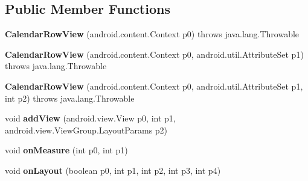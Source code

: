 \subsection*{Public Member Functions}
\begin{DoxyCompactItemize}
\item 
\hypertarget{classmd5afd6673e0ee9440e9d745cae3b1062af_1_1CalendarRowView_abcee3be2a49c88c2d840d0bcc00f5f03}{}{\bfseries Calendar\+Row\+View} (android.\+content.\+Context p0)  throws java.\+lang.\+Throwable 	\label{classmd5afd6673e0ee9440e9d745cae3b1062af_1_1CalendarRowView_abcee3be2a49c88c2d840d0bcc00f5f03}

\item 
\hypertarget{classmd5afd6673e0ee9440e9d745cae3b1062af_1_1CalendarRowView_af46d38092989d08c41cbee7390d1b1e3}{}{\bfseries Calendar\+Row\+View} (android.\+content.\+Context p0, android.\+util.\+Attribute\+Set p1)  throws java.\+lang.\+Throwable 	\label{classmd5afd6673e0ee9440e9d745cae3b1062af_1_1CalendarRowView_af46d38092989d08c41cbee7390d1b1e3}

\item 
\hypertarget{classmd5afd6673e0ee9440e9d745cae3b1062af_1_1CalendarRowView_abcd8515f8c15ab5d515f050a4445b085}{}{\bfseries Calendar\+Row\+View} (android.\+content.\+Context p0, android.\+util.\+Attribute\+Set p1, int p2)  throws java.\+lang.\+Throwable 	\label{classmd5afd6673e0ee9440e9d745cae3b1062af_1_1CalendarRowView_abcd8515f8c15ab5d515f050a4445b085}

\item 
\hypertarget{classmd5afd6673e0ee9440e9d745cae3b1062af_1_1CalendarRowView_a89b1ccb8d6262770d0d45d7571228b57}{}void {\bfseries add\+View} (android.\+view.\+View p0, int p1, android.\+view.\+View\+Group.\+Layout\+Params p2)\label{classmd5afd6673e0ee9440e9d745cae3b1062af_1_1CalendarRowView_a89b1ccb8d6262770d0d45d7571228b57}

\item 
\hypertarget{classmd5afd6673e0ee9440e9d745cae3b1062af_1_1CalendarRowView_a4a453394200f66f2d1244d68fa2f6cf9}{}void {\bfseries on\+Measure} (int p0, int p1)\label{classmd5afd6673e0ee9440e9d745cae3b1062af_1_1CalendarRowView_a4a453394200f66f2d1244d68fa2f6cf9}

\item 
\hypertarget{classmd5afd6673e0ee9440e9d745cae3b1062af_1_1CalendarRowView_a3ec828f32dec710b33a4ee5ffc63a077}{}void {\bfseries on\+Layout} (boolean p0, int p1, int p2, int p3, int p4)\label{classmd5afd6673e0ee9440e9d745cae3b1062af_1_1CalendarRowView_a3ec828f32dec710b33a4ee5ffc63a077}


\end{DoxyCompactItemize}
